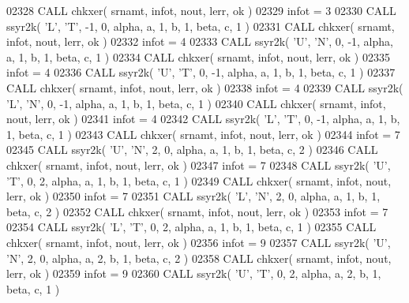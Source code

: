 \begin{DoxyCode}
02328       \textcolor{keyword}{CALL }chkxer( srnamt, infot, nout, lerr, ok )
02329       infot = 3
02330       \textcolor{keyword}{CALL }ssyr2k( \textcolor{stringliteral}{'L'}, \textcolor{stringliteral}{'T'}, -1, 0, alpha, a, 1, b, 1, beta, c, 1 )
02331       \textcolor{keyword}{CALL }chkxer( srnamt, infot, nout, lerr, ok )
02332       infot = 4
02333       \textcolor{keyword}{CALL }ssyr2k( \textcolor{stringliteral}{'U'}, \textcolor{stringliteral}{'N'}, 0, -1, alpha, a, 1, b, 1, beta, c, 1 )
02334       \textcolor{keyword}{CALL }chkxer( srnamt, infot, nout, lerr, ok )
02335       infot = 4
02336       \textcolor{keyword}{CALL }ssyr2k( \textcolor{stringliteral}{'U'}, \textcolor{stringliteral}{'T'}, 0, -1, alpha, a, 1, b, 1, beta, c, 1 )
02337       \textcolor{keyword}{CALL }chkxer( srnamt, infot, nout, lerr, ok )
02338       infot = 4
02339       \textcolor{keyword}{CALL }ssyr2k( \textcolor{stringliteral}{'L'}, \textcolor{stringliteral}{'N'}, 0, -1, alpha, a, 1, b, 1, beta, c, 1 )
02340       \textcolor{keyword}{CALL }chkxer( srnamt, infot, nout, lerr, ok )
02341       infot = 4
02342       \textcolor{keyword}{CALL }ssyr2k( \textcolor{stringliteral}{'L'}, \textcolor{stringliteral}{'T'}, 0, -1, alpha, a, 1, b, 1, beta, c, 1 )
02343       \textcolor{keyword}{CALL }chkxer( srnamt, infot, nout, lerr, ok )
02344       infot = 7
02345       \textcolor{keyword}{CALL }ssyr2k( \textcolor{stringliteral}{'U'}, \textcolor{stringliteral}{'N'}, 2, 0, alpha, a, 1, b, 1, beta, c, 2 )
02346       \textcolor{keyword}{CALL }chkxer( srnamt, infot, nout, lerr, ok )
02347       infot = 7
02348       \textcolor{keyword}{CALL }ssyr2k( \textcolor{stringliteral}{'U'}, \textcolor{stringliteral}{'T'}, 0, 2, alpha, a, 1, b, 1, beta, c, 1 )
02349       \textcolor{keyword}{CALL }chkxer( srnamt, infot, nout, lerr, ok )
02350       infot = 7
02351       \textcolor{keyword}{CALL }ssyr2k( \textcolor{stringliteral}{'L'}, \textcolor{stringliteral}{'N'}, 2, 0, alpha, a, 1, b, 1, beta, c, 2 )
02352       \textcolor{keyword}{CALL }chkxer( srnamt, infot, nout, lerr, ok )
02353       infot = 7
02354       \textcolor{keyword}{CALL }ssyr2k( \textcolor{stringliteral}{'L'}, \textcolor{stringliteral}{'T'}, 0, 2, alpha, a, 1, b, 1, beta, c, 1 )
02355       \textcolor{keyword}{CALL }chkxer( srnamt, infot, nout, lerr, ok )
02356       infot = 9
02357       \textcolor{keyword}{CALL }ssyr2k( \textcolor{stringliteral}{'U'}, \textcolor{stringliteral}{'N'}, 2, 0, alpha, a, 2, b, 1, beta, c, 2 )
02358       \textcolor{keyword}{CALL }chkxer( srnamt, infot, nout, lerr, ok )
02359       infot = 9
02360       \textcolor{keyword}{CALL }ssyr2k( \textcolor{stringliteral}{'U'}, \textcolor{stringliteral}{'T'}, 0, 2, alpha, a, 2, b, 1, beta, c, 1 )

\end{DoxyCode}
